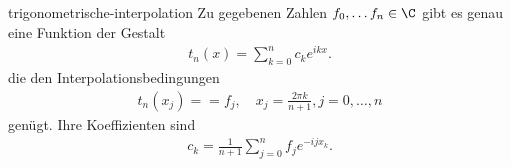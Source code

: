 \begin{Satz}{trigonometrische-interpolation}
  Zu gegebenen Zahlen $f_0,\dots f_n\in \C$ gibt es genau eine
  Funktion der Gestalt
  \begin{gather}
    t_n(x) = \sum_{k=0}^n c_k e^{ikx}.
  \end{gather}
  die den Interpolationsbedingungen
  \begin{gather}
    t_n(x_j) = = f_j, \quad x_j = \frac{2\pi k}{n+1}, j=0,\dots,n
  \end{gather}
  genügt. Ihre Koeffizienten sind
  \begin{gather}
    c_k = \frac{1}{n+1} \sum_{j=0}^n f_j e^{-ijx_k}.
  \end{gather}
\end{Satz}




